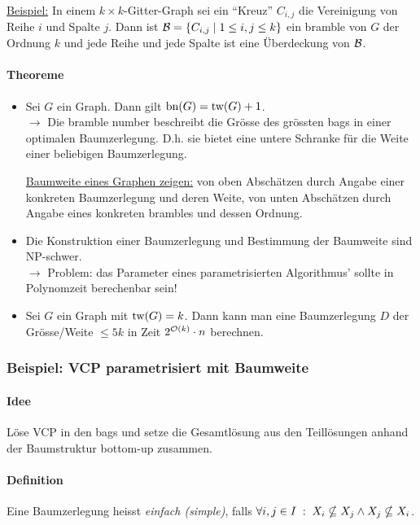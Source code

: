 \underline{Beispiel:}
In einem $k \times k$-Gitter-Graph sei ein ``Kreuz'' $C_{i,j}$ die Vereinigung von Reihe $i$ und Spalte $j$.
Dann ist $\mathcal{B} = \{C_{i,j} \; | \; 1 \leq i,j \leq k \}$ ein bramble von $G$ der Ordnung $k$
und jede Reihe und jede Spalte ist eine Überdeckung von $\mathcal{B}$.

\paragraph{Theoreme}
\begin{itemize}
    \item Sei $G$ ein Graph. Dann gilt $\text{bn}(G) = \text{tw}(G) + 1$. \\
    $\longrightarrow$ Die bramble number beschreibt die Grösse des grössten bags in einer optimalen Baumzerlegung.
    D.h. sie bietet eine untere Schranke für die Weite einer beliebigen Baumzerlegung.

    \underline{Baumweite eines Graphen zeigen:}
    von oben Abschätzen durch Angabe einer konkreten Baumzerlegung und deren Weite,
    von unten Abschätzen durch Angabe eines konkreten brambles und dessen Ordnung.
    \item Die Konstruktion einer Baumzerlegung und Bestimmung der Baumweite sind NP-schwer. \\
    $\longrightarrow$ Problem: das Parameter eines parametrisierten Algorithmus' sollte in Polynomzeit berechenbar sein!
    \item Sei $G$ ein Graph mit $\text{tw}(G)=k$. Dann kann man eine Baumzerlegung $D$ der Grösse/Weite $\leq 5k$
    in Zeit $2^{\mathcal{O}(k)} \cdot n$ berechnen.
\end{itemize}

\subsubsection{Beispiel: VCP parametrisiert mit Baumweite}

\paragraph{Idee}
Löse VCP in den bags und setze die Gesamtlösung aus den Teillösungen anhand der Baumstruktur bottom-up zusammen.

\paragraph{Definition}
Eine Baumzerlegung heisst \emph{einfach (simple)}, falls
$\forall i, j \in I \; : \; X_i \nsubseteq X_j \wedge X_j \nsubseteq X_i$.

